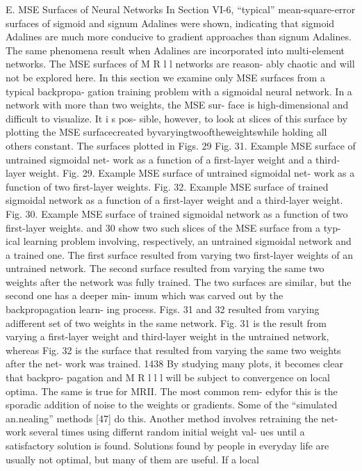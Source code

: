 E. MSE Surfaces of Neural Networks In Section VI-6, ``typical''
mean-square-error surfaces of sigmoid and signum Adalines were shown,
indicating that sigmoid Adalines are much more conducive to gradient
approaches than signum Adalines. The same phenomena result when Adalines
are incorporated into multi-element networks. The MSE surfaces of M R l
l networks are reason- ably chaotic and will not be explored here. In
this section we examine only MSE surfaces from a typical backpropa-
gation training problem with a sigmoidal neural network. In a network
with more than two weights, the MSE sur- face is high-dimensional and
difficult to visualize. It i s pos- sible, however, to look at slices of
this surface by plotting the MSE surfacecreated
byvaryingtwooftheweightswhile holding all others constant. The surfaces
plotted in Figs. 29 Fig. 31. Example MSE surface of untrained sigmoidal
net- work as a function of a first-layer weight and a third-layer
weight. Fig. 29. Example MSE surface of untrained sigmoidal net- work as
a function of two first-layer weights. Fig. 32. Example MSE surface of
trained sigmoidal network as a function of a first-layer weight and a
third-layer weight. Fig. 30. Example MSE surface of trained sigmoidal
network as a function of two first-layer weights. and 30 show two such
slices of the MSE surface from a typ- ical learning problem involving,
respectively, an untrained sigmoidal network and a trained one. The
first surface resulted from varying two first-layer weights of an
untrained network. The second surface resulted from varying the same two
weights after the network was fully trained. The two surfaces are
similar, but the second one has a deeper min- imum which was carved out
by the backpropagation learn- ing process. Figs. 31 and 32 resulted from
varying adifferent set of two weights in the same network. Fig. 31 is
the result from varying a first-layer weight and third-layer weight in
the untrained network, whereas Fig. 32 is the surface that resulted from
varying the same two weights after the net- work was trained. 1438 By
studying many plots, it becomes clear that backpro- pagation and M R l l
l will be subject to convergence on local optima. The same is true for
MRII. The most common rem- edyfor this is the sporadic addition of noise
to the weights or gradients. Some of the ``simulated an.nealing''
methods {[}47{]} do this. Another method involves retraining the net-
work several times using differnt random initial weight val- ues until a
satisfactory solution is found. Solutions found by people in everyday
life are usually not optimal, but many of them are useful. If a local

